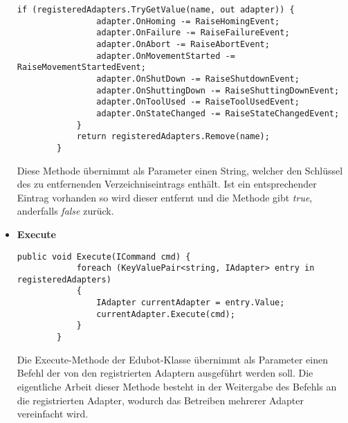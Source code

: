 \begin{itemize}
\begin{lstlisting}[language = CSharp, captionpos=b, caption={Die DeregisterAdapter-Methode}]
            if (registeredAdapters.TryGetValue(name, out adapter)) {
                adapter.OnHoming -= RaiseHomingEvent;
                adapter.OnFailure -= RaiseFailureEvent;
                adapter.OnAbort -= RaiseAbortEvent;
                adapter.OnMovementStarted -= RaiseMovementStartedEvent;
                adapter.OnShutDown -= RaiseShutdownEvent;
                adapter.OnShuttingDown -= RaiseShuttingDownEvent;
                adapter.OnToolUsed -= RaiseToolUsedEvent;
                adapter.OnStateChanged -= RaiseStateChangedEvent;
            }
            return registeredAdapters.Remove(name);
        }
\end{lstlisting}
Diese Methode übernimmt als Parameter einen String, welcher den Schlüssel des zu entfernenden Verzeichniseintrags enthält. Ist ein entsprechender Eintrag vorhanden so wird dieser entfernt und die Methode gibt \textit{true}, anderfalls \textit{false} zurück.
\item \textbf{Execute}
\begin{lstlisting}[language = CSharp, captionpos=b, caption={Die Execute-Methode der Edubot-Klasse}]
public void Execute(ICommand cmd) {
            foreach (KeyValuePair<string, IAdapter> entry in registeredAdapters)
            {
                IAdapter currentAdapter = entry.Value;
                currentAdapter.Execute(cmd);
            }
        }
\end{lstlisting}
Die Execute-Methode der Edubot-Klasse übernimmt als Parameter einen Befehl der von den registrierten Adaptern ausgeführt werden soll. Die eigentliche Arbeit dieser Methode besteht in der Weitergabe des Befehls an die registrierten Adapter, wodurch das Betreiben mehrerer Adapter vereinfacht wird. 
\end{itemize}

